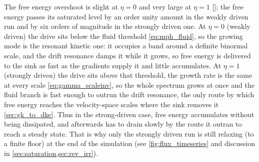 \documentclass{jpp}
\begin{document}
The free energy overshoot is slight at $\eta = 0$ and very large at $\eta = 1$ []; the free energy passes its saturated level by an order unity amount in the weakly driven run and by six orders of magnitude in the strongly driven one. At $\eta = 0$ (weakly driven) the drive sits below the fluid threshold \cref{eq:mph_fluid}, so the growing mode is the resonant kinetic one: it occupies a band around a definite binormal scale, and the drift resonance damps it while it grows, so free energy is delivered to the sink as fast as the gradients supply it and little accumulates. At $\eta = 1$ (strongly driven) the drive sits above that threshold, the growth rate is the same at every scale \cref{eq:gamma_scaleinv}, so the whole spectrum grows at once and the fluid branch is fast enough to outrun the drift resonance, the only route by which free energy reaches the velocity-space scales where the sink removes it \cref{sec:gk_to_dke}. Thus in the strong-driven case, free energy accumulates without being dissipated, and afterwards has to drain slowly by the route it outran to reach a steady state. That is why only the strongly driven run is still relaxing (to a finite floor) at the end of the simulation (see \cref{fig:flux_timeseries} and discussion in \cref{sec:saturation,sec:rev_irr}).
\end{document}
